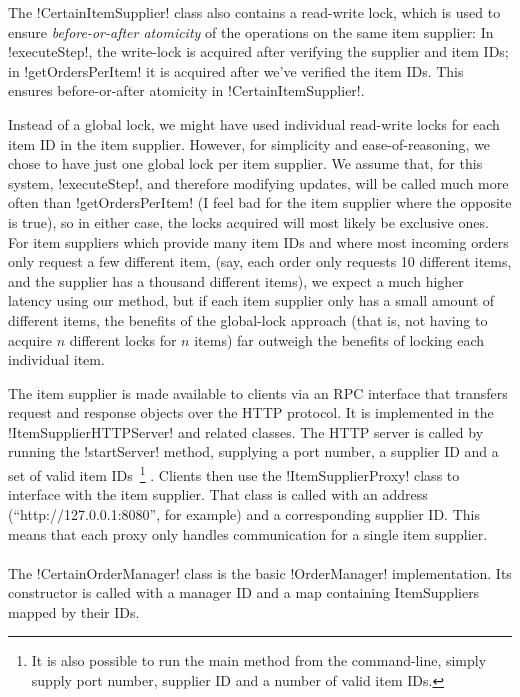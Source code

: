 \documentclass[a4paper, 12pt]{article}
\begin{document}
The !CertainItemSupplier! class also contains a read-write lock, which
is used to ensure \emph{before-or-after atomicity} of the operations
on the same item supplier: In !executeStep!, the write-lock is
acquired after verifying the supplier and item IDs; in
!getOrdersPerItem! it is acquired after we've verified the item
IDs. This ensures before-or-after atomicity in !CertainItemSupplier!.

Instead of a global lock, we might have used individual read-write
locks for each item ID in the item supplier. However, for simplicity
and ease-of-reasoning, we chose to have just one global lock per item
supplier. We assume that, for this system, !executeStep!, and
therefore modifying updates, will be called much more often than
!getOrdersPerItem! (I feel bad for the item supplier where the
opposite is true), so in either case, the locks acquired will most
likely be exclusive ones. For item suppliers which provide many item
IDs and where most incoming orders only request a few different item,
(say, each order only requests 10 different items, and the supplier
has a thousand different items), we expect a much higher latency using
our method, but if each item supplier only has a small amount of
different items, the benefits of the global-lock approach (that is,
not having to acquire $n$ different locks for $n$ items) far outweigh
the benefits of locking each individual item.

The item supplier is made available to clients via an RPC interface
that transfers request and response objects over the HTTP protocol. It
is implemented in the !ItemSupplierHTTPServer! and related
classes. The HTTP server is called by running the !startServer!
method, supplying a port number, a supplier ID and a set of valid item
IDs~\footnote{It is also possible to run the main method from the
  command-line, simply supply port number, supplier ID and a number of
  valid item IDs. } . Clients then use the !ItemSupplierProxy! class
to interface with the item supplier. That class is called with an
address (``http://127.0.0.1:8080'', for example) and a corresponding
supplier ID. This means that each proxy only handles communication
for a single item supplier.

\paragraph{}

The !CertainOrderManager! class is the basic !OrderManager!
implementation. Its constructor is called with a manager ID and a map
containing ItemSuppliers mapped by their IDs.
\end{document}
